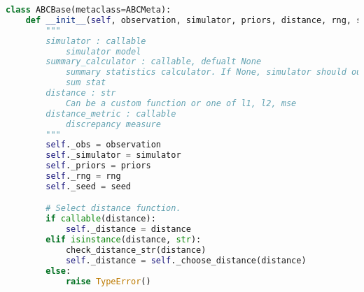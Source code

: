 \begin{lstlisting}[language=python]
class ABCBase(metaclass=ABCMeta):
    def __init__(self, observation, simulator, priors, distance, rng, seed):
        """
        simulator : callable
            simulator model
        summary_calculator : callable, defualt None
            summary statistics calculator. If None, simulator should output
            sum stat
        distance : str
            Can be a custom function or one of l1, l2, mse
        distance_metric : callable
            discrepancy measure
        """
        self._obs = observation
        self._simulator = simulator
        self._priors = priors
        self._rng = rng
        self._seed = seed

        # Select distance function.
        if callable(distance):
            self._distance = distance
        elif isinstance(distance, str):
            check_distance_str(distance)
            self._distance = self._choose_distance(distance)
        else:
            raise TypeError()
\end{lstlisting}